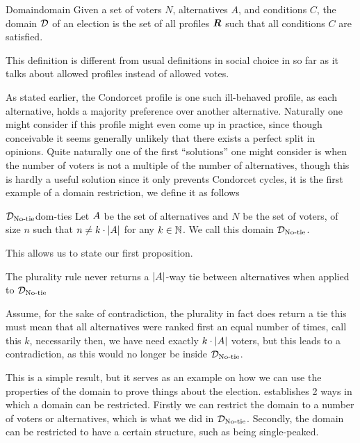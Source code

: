 \begin{definition}{Domain}{domain}
	{
		Given a set of voters $N$, alternatives $A$, and conditions $C$, the domain $\mathcal{D}_{\textnormal{}}$ of an election is the set of all profiles $\boldsymbol{R}$ such that all conditions $C$ are satisfied.
	}
\end{definition}

This definition is different from usual definitions in social choice in so far as it talks about allowed profiles instead of allowed votes.


As stated earlier, the Condorcet profile is one such ill-behaved profile, as each alternative, holds a majority preference over another alternative. Naturally one might consider if this profile might even come up in practice, since though conceivable it seems generally unlikely that there exists a perfect split in opinions. Quite naturally one of the first ``solutions'' one might consider is when the number of voters is not a multiple of the number of alternatives, though this is hardly a useful solution since it only prevents Condorcet cycles, it is the first example of a domain restriction, we define it as follows

\begin{definition}{$\mathcal{D}_{\textnormal{No-tie}}$}{dom-ties}
	Let $A$ be the set of alternatives and $N$ be the set of voters, of size $n$ such that $n \neq k \cdot |A|$ for any $k \in \mathbb{N}$. We call this domain $\mathcal{D}_{\textnormal{No-tie}}$.
\end{definition}

This allows us to state our first proposition.

\begin{proposition}
	The plurality rule never returns a $|A|$-way tie between alternatives when applied to $\mathcal{D}_{\textnormal{No-tie}}$
\end{proposition}

\begin{proofc}
	Assume, for the sake of contradiction, the plurality in fact does return a tie this must mean that all alternatives were ranked first an equal number of times, call this $k$, necessarily then, we have need exactly $k \cdot |A|$ voters, but this leads to a contradiction, as this would no longer be inside $\mathcal{D}_{\textnormal{No-tie}}$.
\end{proofc}

This is a simple result, but it serves as an example on how we can use the properties of the domain to prove things about the election. \citet{gaertnerDomainRestrictions2002} establishes 2 ways in which a domain can be restricted. Firstly we can restrict the domain to a number of voters or alternatives, which is what we did in $\mathcal{D}_{\textnormal{No-tie}}$. Secondly, the domain can be restricted to have a certain structure, such as being single-peaked.


